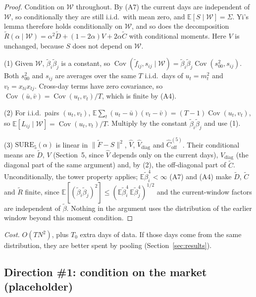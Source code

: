 \documentclass[11pt]{article}
\theoremstyle{remark}
\begin{document}
\begin{proof}
Condition on $\mathcal{W}$ throughout. By (A7) the current days are independent of $\mathcal{W}$, so conditionally they are still i.i.d.\ with mean zero, and $\mathbb{E}[S \mid \mathcal{W}] = \Sigma$. Yi's lemma therefore holds conditionally on $\mathcal{W}$, and so does the decomposition $\tilde R(\alpha \mid \mathcal{W}) = \alpha^2\tilde D + (1-2\alpha)V + 2\alpha\tilde C$ with conditional moments. Here $V$ is unchanged, because $S$ does not depend on $\mathcal{W}$.

(1) Given $\mathcal{W}$, $\tilde\beta_i\tilde\beta_j$ is a constant, so $\operatorname{Cov}(\tilde f_{ij}, s_{ij} \mid \mathcal{W}) = \tilde\beta_i\tilde\beta_j\operatorname{Cov}(s_{00}^2, s_{ij})$. Both $s_{00}^2$ and $s_{ij}$ are averages over the same $T$ i.i.d.\ days of $u_t = m_t^2$ and $v_t = x_{ti}x_{tj}$. Cross-day terms have zero covariance, so $\operatorname{Cov}(\bar u, \bar v) = \operatorname{Cov}(u_t, v_t)/T$, which is finite by (A4).

(2) For i.i.d.\ pairs $(u_t, v_t)$, $\mathbb{E}\sum_t(u_t - \bar u)(v_t - \bar v) = (T-1)\operatorname{Cov}(u_t, v_t)$, so $\mathbb{E}[L_{ij} \mid \mathcal{W}] = \operatorname{Cov}(u_t, v_t)/T$. Multiply by the constant $\tilde\beta_i\tilde\beta_j$ and use (1).

(3) $\mathrm{SURE}_5(\alpha)$ is linear in $\|\tilde F - S\|^2$, $\hat V$, $\hat V_{\mathrm{diag}}$ and $\hat C^{(5)}_{\mathrm{off}}$. Their conditional means are $\tilde D$, $V$ (Section~5, since $\hat V$ depends only on the current days), $V_{\mathrm{diag}}$ (the diagonal part of the same argument) and, by (2), the off-diagonal part of $\tilde C$. Unconditionally, the tower property applies; $\mathbb{E}\tilde\beta_i^4 < \infty$ (A7) and (A4) make $\tilde D$, $\tilde C$ and $\tilde R$ finite, since $\mathbb{E}[(\tilde\beta_i\tilde\beta_j)^2] \le (\mathbb{E}\tilde\beta_i^4\,\mathbb{E}\tilde\beta_j^4)^{1/2}$ and the current-window factors are independent of $\tilde\beta$. Nothing in the argument uses the distribution of the earlier window beyond this moment condition.
\end{proof}

\emph{Cost.} $O(TN^2)$, plus $T_0$ extra days of data. If those days come from the same distribution, they are better spent by pooling (Section~\ref{sec:results}).

\subsection{Direction \#1: condition on the market (placeholder)}
\end{document}
